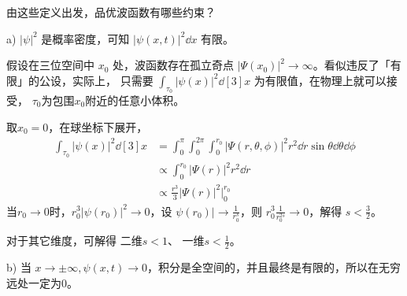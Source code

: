 由这些定义出发，品优波函数有哪些约束？

a) $|\psi|^2$ 是概率密度，可知 $|\psi(x,t)|^2 \dd x$ 有限。

{
    假设在三位空间中 $x_0 $ 处，波函数存在孤立奇点 $ |\Psi(x_0)|^2 \rightarrow \infty $。看似违反了「有限」的公设，实际上，
	只需要 $\int_{\tau_0} |\psi(x)|^2 \dd[3] x$ 为有限值，在物理上就可以接受，
	$ \tau_0 $为包围$ x_0 $附近的任意小体积。
	
	取$ x_0 = 0 $，在球坐标下展开，
	\begin{align}
	\int_{\tau_0} |\psi(x)|^2 \dd[3] x &= \int_0^\pi \int_0^{2\pi} \int_0^{r_0} |\Psi(r,\theta,\phi)|^2 r^2\dd r \sin\theta\dd\theta \dd\phi \\
	&\propto \int_0^{r_0} |\Psi(r)|^2 r^2 \dd r \\
	&\propto \frac{r^3}{3} |\Psi(r)|^2 \Big|_0^{r_0}
	\end{align}
	当$ r_0 \rightarrow 0 $时，$r_0^3 |\psi(r_0)|^2 \rightarrow 0$，设 $\psi(r_0)| \rightarrow \frac1{r_0^s}$，则 $r_0^3 \frac{1}{r_0^{2s}} \rightarrow 0$，解得 $s < \frac32$。

    对于其它维度，可解得 二维$ s < 1 $、 一维$ s < \frac{1}{2} $。
}

b) 当 $x\rightarrow\pm\infty, \psi(x,t)\rightarrow0$，积分是全空间的，并且最终是有限的，所以在无穷远处一定为0。

